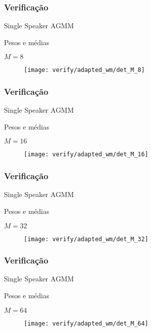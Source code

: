 \begin{frame}
\frametitle{Verificação}
\begin{description}
    \item[SSAGMM] Single Speaker AGMM
    \item[Adaptação] Pesos e médias
    \item $M = 8$
\end{description}

\begin{figure}[ht]
    \centering
    \texttt{[image: verify/adapted\_wm/det\_M\_8]}
\end{figure}
\end{frame}

\begin{frame}
\frametitle{Verificação}
\begin{description}
    \item[SSAGMM] Single Speaker AGMM
    \item[Adaptação] Pesos e médias
    \item $M = 16$
\end{description}

\begin{figure}[ht]
    \centering
    \texttt{[image: verify/adapted\_wm/det\_M\_16]}
\end{figure}
\end{frame}

\begin{frame}
\frametitle{Verificação}
\begin{description}
    \item[SSAGMM] Single Speaker AGMM
    \item[Adaptação] Pesos e médias
    \item $M = 32$
\end{description}

\begin{figure}[ht]
    \centering
    \texttt{[image: verify/adapted\_wm/det\_M\_32]}
\end{figure}
\end{frame}

\begin{frame}
\frametitle{Verificação}
\begin{description}
    \item[SSAGMM] Single Speaker AGMM
    \item[Adaptação] Pesos e médias
    \item $M = 64$
\end{description}

\begin{figure}[ht]
    \centering
    \texttt{[image: verify/adapted\_wm/det\_M\_64]}
\end{figure}
\end{frame}

